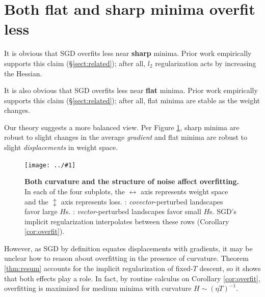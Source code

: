 \documentclass[openany, notitlepage, justified]{tufte-book}
\newcommand{\offour}[1]{
    {\tiny
        \raisebox{0.04cm}{$\substack{
            \IfSubStr{#1}{0}{{\color{moor}\blacksquare}}{\square}   
            \IfSubStr{#1}{0}{{\color{moor}\blacksquare}}{\square} \\
            \IfSubStr{#1}{1}{{\color{moor}\blacksquare}}{\square}    
            \IfSubStr{#1}{1}{{\color{moor}\blacksquare}}{\square}    
        }$}%
    }%
}
\theoremstyle{plain}
\theoremstyle{definition}
\newcommand{\plotmoow}[3]{\texttt{[image: ../\#1]}}
\begin{document}
    \section{Both flat and sharp minima overfit less}
            \label{subsect:curvature-and-overfitting}%

            It is obvious that SGD overfits less near \textbf{sharp} minima.
            Prior work empirically supports this claim (\S\ref{sect:related});
            after all, $l_2$ regularization acts by increasing the Hessian.

            It is also obvious that SGD overfits less near \textbf{flat}
            minima.  Prior work empirically supports this claim
            (\S\ref{sect:related}); after all, flat minima are stable as the
            weight changes.

            Our theory suggests a more balanced view.  Per Figure
            \ref{fig:spring}, sharp minima are robust to slight changes in the
            average \emph{gradient} and flat minima are robust to slight
            \emph{displacements} in weight space.
            \begin{figure}
                \centering
                \plotmoow{diagrams/sharp}{0.6\columnwidth}{}
                \caption{%
                   \textbf{
                        Both curvature and the structure of noise affect
                        overfitting.} In each of the four subplots, the  
                        $\leftrightarrow$ axis represents weight space and the
                        $\updownarrow$ axis represents loss.
                        \protect\offour{0}:
                        \emph{covector}-perturbed landscapes favor large $H$s.
                        \protect\offour{1}:
                        \emph{vector}-perturbed landscapes favor small $H$s.
                        SGD's implicit regularization interpolates between
                        these rows (Corollary \ref{cor:overfit}).
                }
                \label{fig:spring}
            \end{figure}
            However, as SGD by
            definition equates displacements with gradients, it may be unclear
            how to reason about overfitting in the presence of curvature.
            Theorem \ref{thm:resum} accounts for the implicit regularization of
            fixed-$T$ descent, so it shows that both effects play a role.  In
            fact, by routine calculus on Corollary
            \ref{cor:overfit}, overfitting is maximized for medium minima with
            curvature $H \sim (\eta T)^{-1}$.
\end{document}
